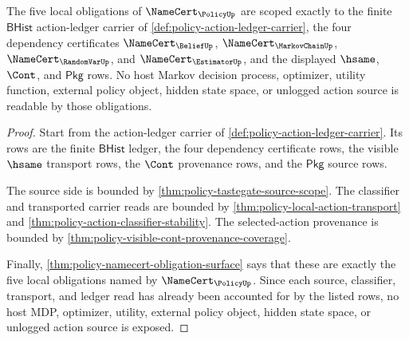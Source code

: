 \begin{theorem}
\label{thm:policy-kernel-scope-boundary}
The five local obligations of $\NameCert_{\PolicyUp}$ are scoped exactly to
the finite $\mathsf{BHist}$ action-ledger carrier of
\autoref{def:policy-action-ledger-carrier}, the four dependency certificates
$\NameCert_{\BeliefUp}$, $\NameCert_{\MarkovChainUp}$,
$\NameCert_{\RandomVarUp}$, and $\NameCert_{\EstimatorUp}$, and the displayed
$\hsame$, $\Cont$, and $\mathsf{Pkg}$ rows. No host Markov decision process,
optimizer, utility function, external policy object, hidden state space, or
unlogged action source is readable by those obligations.
\end{theorem}
\begin{proof}
Start from the action-ledger carrier of
\autoref{def:policy-action-ledger-carrier}. Its rows are the finite
$\mathsf{BHist}$ ledger, the four dependency certificate rows, the visible
$\hsame$ transport rows, the $\Cont$ provenance rows, and the $\mathsf{Pkg}$
source rows.

The source side is bounded by
\autoref{thm:policy-tastegate-source-scope}. The classifier and transported
carrier reads are bounded by
\autoref{thm:policy-local-action-transport} and
\autoref{thm:policy-action-classifier-stability}. The selected-action
provenance is bounded by
\autoref{thm:policy-visible-cont-provenance-coverage}.

Finally, \autoref{thm:policy-namecert-obligation-surface} says that these are
exactly the five local obligations named by $\NameCert_{\PolicyUp}$. Since
each source, classifier, transport, and ledger read has already been accounted
for by the listed rows, no host MDP, optimizer, utility, external policy
object, hidden state space, or unlogged action source is exposed.
\end{proof}

